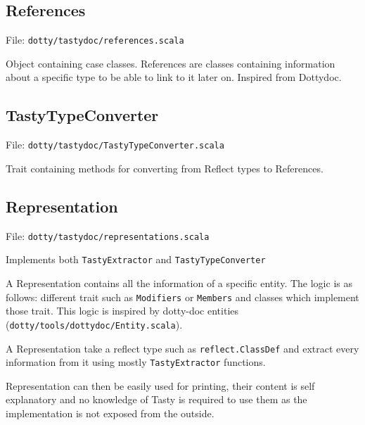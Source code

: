 \documentclass{report}
\begin{document}
\subsection{References}
File: \texttt{dotty/tastydoc/references.scala}

Object containing case classes. References are classes containing information about a specific type to be able to link to it later on. Inspired from Dottydoc.

\subsection{TastyTypeConverter}
File: \texttt{dotty/tastydoc/TastyTypeConverter.scala}

Trait containing methods for converting from Reflect types to References.

\subsection{Representation}
File: \texttt{dotty/tastydoc/representations.scala}

Implements both \texttt{TastyExtractor} and \texttt{TastyTypeConverter}

A Representation contains all the information of a specific entity. The logic is as follows: different trait such as \texttt{Modifiers} or \texttt{Members} and classes which implement those trait. This logic is inspired by dotty-doc entities (\texttt{dotty/tools/dottydoc/Entity.scala}).

A Representation take a reflect type such as \texttt{reflect.ClassDef} and extract every information from it using mostly \texttt{TastyExtractor} functions.

Representation can then be easily used for printing, their content is self explanatory and no knowledge of Tasty is required to use them as the implementation is not exposed from the outside.
\end{document}
